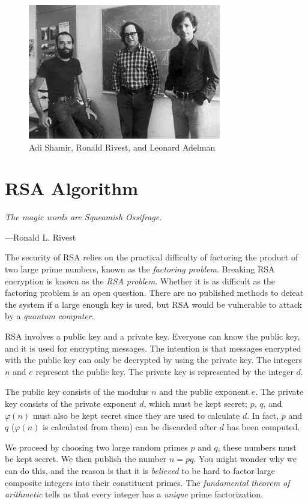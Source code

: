 
\begin{figure}[tbhp]
        \centering
\includegraphics[width=0.75\textwidth]{./images/rsa.jpeg}
        \caption{Adi Shamir, Ronald Rivest, and Leonard Adelman}\label{fig:rsa}
\end{figure}

\section{RSA Algorithm}
\textwidth
\epigraph{\emph{The magic words are \emph{Squeamish Ossifrage}.}}{---Ronald L. Rivest}

\noindent The security of RSA relies on the practical difficulty of
factoring the product of two large prime numbers, known as the
\emph{factoring problem}. Breaking RSA encryption is known as the
\emph{RSA problem}. Whether it is as difficult as the factoring problem
is an open question. There are no published methods to defeat the system
if a large enough key is used, but RSA would be vulnerable to attack by
a \emph{quantum computer}.

RSA involves a public key and a private key. Everyone can know the
public key, and it is used for encrypting messages. The intention is
that messages encrypted with the public key can only be decrypted by
using the private key. The integers $n$ and $e$ represent the public
key. The private key is represented by the integer $d$.

The public key consists of the modulus $n$ and the public exponent $e$.
The private key consists of the private exponent $d$, which must be kept
secret; $p$, $q$, and $\varphi(n)$ must also be kept secret since they
are used to calculate $d$. In fact, $p$ and $q$ ($\varphi(n)$ is
calculated from them) can be discarded after $d$ has been computed.

We proceed by choosing two large random primes $p$ and $q$, these
numbers must be kept secret. We then publish the number $n = p q$. You
might wonder why we can do this, and the reason is that it is
\emph{believed} to be hard to factor large composite integers into their
constituent primes. The \emph{fundamental theorem of arithmetic} tells
us that every integer has a \emph{unique} prime factorization.

